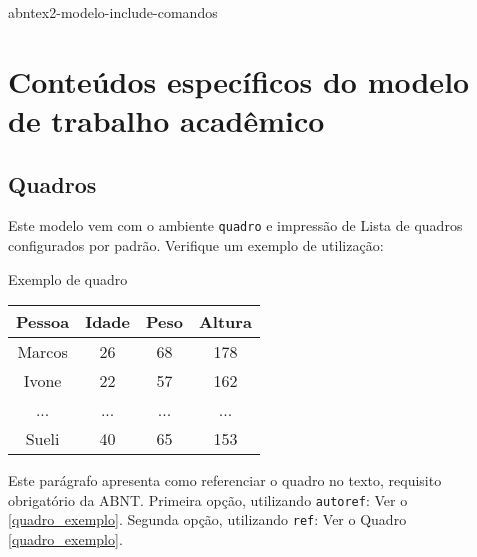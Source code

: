 
{abntex2-modelo-include-comandos}

\chapter{Conteúdos específicos do modelo de trabalho acadêmico}\label{cap_trabalho_academico}

\section{Quadros}

Este modelo vem com o ambiente \texttt{quadro} e impressão de Lista de quadros
configurados por padrão. Verifique um exemplo de utilização:

\begin{quadro}[htb]
  \caption{\label{quadro_exemplo}Exemplo de quadro}
  \begin{tabular}{|c|c|c|c|}
    \hline
    \textbf{Pessoa} & \textbf{Idade} & \textbf{Peso} & \textbf{Altura} \\ \hline
    Marcos          & 26             & 68            & 178             \\ \hline
    Ivone           & 22             & 57            & 162             \\ \hline
    ...             & ...            & ...           & ...             \\ \hline
    Sueli           & 40             & 65            & 153             \\ \hline
  \end{tabular}
\end{quadro}

Este parágrafo apresenta como referenciar o quadro no texto, requisito
obrigatório da ABNT.
Primeira opção, utilizando \texttt{autoref}: Ver o \autoref{quadro_exemplo}.
Segunda opção, utilizando  \texttt{ref}: Ver o Quadro \ref{quadro_exemplo}.